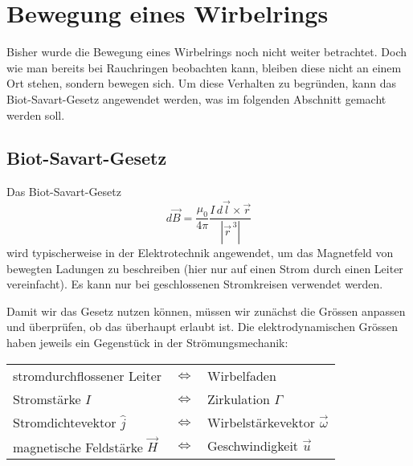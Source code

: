 %
%
%
\section{Bewegung eines Wirbelrings\label{paper:Wirbelringe:Bewegung}}

Bisher wurde die Bewegung eines Wirbelrings noch nicht weiter betrachtet. 
Doch wie man bereits bei Rauchringen beobachten kann, bleiben diese nicht an einem Ort stehen, sondern bewegen sich. 
Um diese Verhalten zu begründen, kann das Biot-Savart-Gesetz \cite{Wirbelringe:FuehrerdurchdieStroemungslehre} angewendet werden, was im folgenden Abschnitt gemacht werden soll.

\subsection{Biot-Savart-Gesetz}

Das Biot-Savart-Gesetz
\[
d \vec{B}
=
\frac{\mu_0}{4\pi}\frac{I \,d \vec{l} \times \vec{r}}{\left\lvert \vec{r}^{\,3}\right\rvert }
\]  %
wird typischerweise in der Elektrotechnik angewendet, um das Magnetfeld von bewegten Ladungen zu beschreiben (hier nur auf einen Strom durch einen Leiter vereinfacht).
Es kann nur bei geschlossenen Stromkreisen verwendet werden. 

Damit wir das Gesetz nutzen können, müssen wir zunächst die Grössen anpassen und überprüfen, ob das überhaupt erlaubt ist. 
Die elektrodynamischen Grössen haben jeweils ein Gegenstück in der Strömungsmechanik:

\begin{center}
    \begin{tabular}{lcl}
    stromdurchflossener Leiter          & \(\Leftrightarrow \) & Wirbelfaden \\
    Stromstärke \(I\)                   & \(\Leftrightarrow \) & Zirkulation \(\Gamma\) \\
    Stromdichtevektor \(\hat{j}\)       & \(\Leftrightarrow \) & Wirbelstärkevektor \(\vec{\omega}\)\\
    magnetische Feldstärke \(\vec{H}\)  & \(\Leftrightarrow \) & Geschwindigkeit \(\vec{u}\) \\
    \end{tabular}
\end{center}

